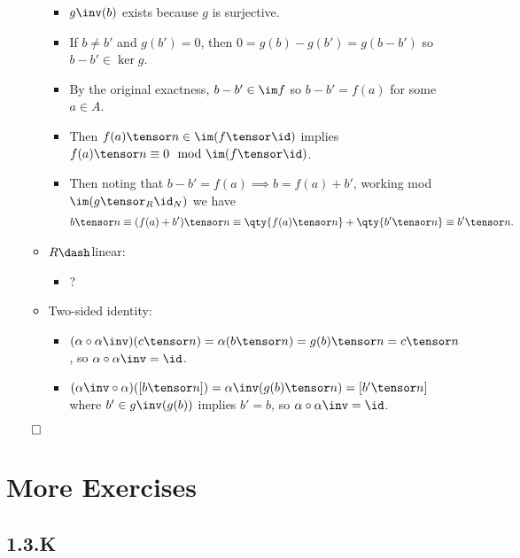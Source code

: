 \begin{itemize}
\begin{itemize}
    \begin{itemize}
    \tightlist
    \item
      \(g\inv(b)\) exists because \(g\) is surjective.
    \item
      If \(b\neq b'\) and \(g(b') = 0\), then
      \(0 = g(b) - g(b') = g(b-b')\) so \(b-b' \in \ker g\).
    \item
      By the original exactness, \(b-b' \in \im f\) so \(b-b' = f(a)\)
      for some \(a\in A\).
    \item
      Then \(f(a) \tensor n \in \im(f\tensor \id)\) implies
      \(f(a)\tensor n \equiv 0 \mod \im(f\tensor \id)\).
    \item
      Then noting that \(b-b' = f(a) \implies b = f(a) + b'\), working
      mod \(\im(g\tensor_R \id_N)\) we have \begin{align*}
      b \tensor n \equiv (f(a) + b') \tensor n \equiv \qty{f(a) \tensor n} + \qty{b' \tensor n} \equiv b'\tensor n 
      .\end{align*}
    \end{itemize}
  \item
    \(R\dash\)linear:

    \begin{itemize}
    \tightlist
    \item
      ?
    \end{itemize}
  \item
    Two-sided identity:

    \begin{itemize}
    \tightlist
    \item
      \((\alpha \circ \alpha\inv)(c\tensor n) = \alpha(b\tensor n) = g(b)\tensor n = c\tensor n\),
      so \(\alpha\circ \alpha\inv = \id\).
    \item
      \((\alpha\inv \circ \alpha)([b\tensor n]) = \alpha\inv(g(b) \tensor n) = [b'\tensor n]\)
      where \(b'\in g\inv(g(b))\) implies \(b'=b\), so
      \(\alpha\circ\alpha\inv = \id\).
    \end{itemize}
  \end{itemize}
\end{itemize}

\(\qed\)

\hypertarget{more-exercises}{%
\section{More Exercises}\label{more-exercises}}

\hypertarget{k}{%
\subsection{1.3.K}\label{k}}

